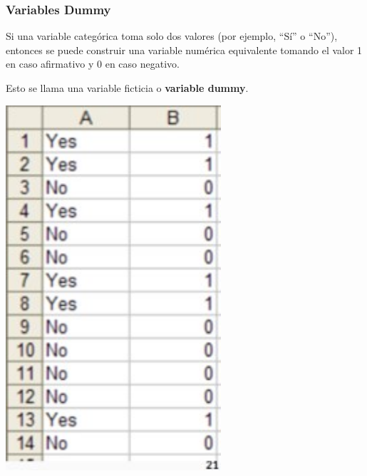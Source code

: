 \documentclass[10pt]{beamer}
\begin{document}
\begin{frame}[fragile]
\frametitle{Variables Dummy}


\begin{minipage}[c]{.45\textwidth}
Si una variable categórica toma solo dos valores (por ejemplo, ``Sí'' o
``No''), entonces se puede construir una variable numérica equivalente tomando el valor 1 en caso afirmativo y 0 en caso negativo.\\

\vspace{4mm}

Esto se llama una variable ficticia o \textbf{variable dummy}.
\end{minipage}
\begin{minipage}[c]{.45\textwidth}
\begin{center}
\includegraphics[width=0.6\textwidth]{dummy2.JPG}
\end{center}
\end{minipage}


\end{frame}


\end{document}
